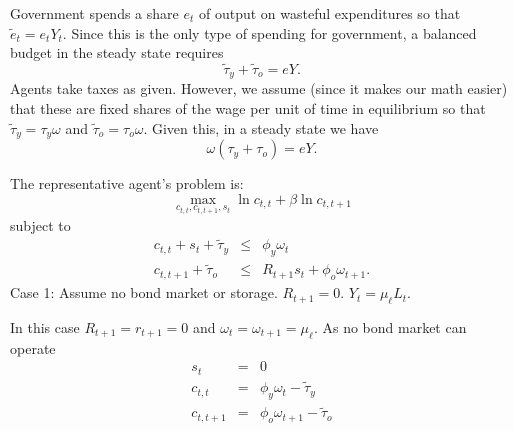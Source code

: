 \documentclass{sebase}
\begin{document}
Government spends a share $e_{t}$ of output on wasteful expenditures so that 
$\tilde{e}_{t}=e_{t}Y_{t}$. Since this is the only type of spending for
government, a balanced budget in the steady state requires 
\begin{equation*}
\tilde{\tau}_{y}+\tilde{\tau}_{o}=eY.
\end{equation*}%
Agents take taxes as given. However, we assume (since it makes our math
easier) that these are fixed shares of the wage per unit of time in
equilibrium so that $\tilde{\tau}_{y}=\tau _{y}\omega $ and $\tilde{\tau}%
_{o}=\tau _{o}\omega $. Given this, in a steady state we have 
\begin{equation*}
\omega \left( \tau _{y}+\tau _{o}\right) =eY.
\end{equation*}%
\pagebreak

The representative agent's problem is: 
\begin{equation*}
\underset{c_{t,t},c_{t,t+1},s_{t}}{\max }\ln c_{t,t}+\beta \ln c_{t,t+1}
\end{equation*}%
subject to 
\begin{eqnarray*}
c_{t,t}+s_{t}+\tilde{\tau}_{y} &\leq &\phi _{y}\omega _{t} \\
c_{t,t+1}+\tilde{\tau}_{o} &\leq &R_{t+1}s_{t}+\phi _{o}\omega _{t+1}.
\end{eqnarray*}%
Case 1: Assume no bond market or storage. $R_{t+1}=0.$ $Y_{t}=\mu _{\ell
}L_{t}$.

In this case $R_{t+1}=r_{t+1}=0$ and $\omega _{t}=\omega _{t+1}=\mu _{\ell
}. $ As no bond market can operate%
\begin{eqnarray*}
s_{t} &=&0 \\
c_{t,t} &=&\phi _{y}\omega _{t}-\tilde{\tau}_{y} \\
c_{t,t+1} &=&\phi _{o}\omega _{t+1}-\tilde{\tau}_{o}
\end{eqnarray*}%
\pagebreak
\end{document}
